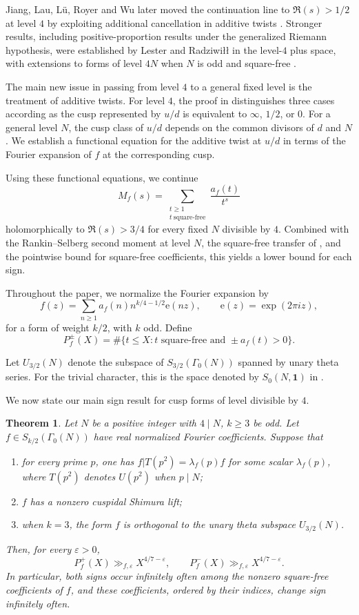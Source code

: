 \documentclass[10pt,a4paper]{amsart}
\newtheorem{theorem}{Theorem}[section]
\newcommand{\e}{\mathrm{e}}
\begin{document}
Jiang, Lau, L\"u, Royer and Wu later moved the continuation line to
$\Re(s)>1/2$ at level $4$ by exploiting additional cancellation in
additive twists \cite{JLRW}. Stronger results, including
positive-proportion results under the generalized Riemann hypothesis,
were established by Lester and Radziwi\l\l{} in the level-$4$ plus space,
with extensions to forms of level $4N$ when $N$ is odd and square-free
\cite{LesterRadz}.

The main new issue in passing from level $4$ to a general fixed level
is the treatment of additive twists. For level \(4\), the proof in
\cite{HKKL} distinguishes three cases according as the cusp represented by
\(u/d\) is equivalent to \(\infty\), \(1/2\), or \(0\).
For a general level \(N\), the cusp class of \(u/d\) depends on the
common divisors of \(d\) and \(N\). We establish a functional equation
for the additive twist at \(u/d\) in terms of the Fourier expansion of
\(f\) at the corresponding cusp. 

Using these functional equations, we continue
\[
M_f(s)=\sum_{\substack{t\geq1\\t\ \mathrm{square\text{-}free}}}
\frac{a_f(t)}{t^s}
\]
holomorphically to $\Re(s)>3/4$ for every fixed \(N\) divisible by \(4\). Combined with the Rankin--Selberg second moment at level
$N$, the square-free transfer of \cite[Lemma~9]{LRW}, and the pointwise
bound for square-free coefficients, this yields a lower bound
for each sign.

Throughout the paper, we normalize the Fourier expansion by
\[
f(z)=\sum_{n\ge1}a_f(n)n^{k/4-1/2}\e(nz),\qquad \e(z)=\exp(2\pi iz),
\]
for a form of weight $k/2$, with $k$ odd. Define
\[
P_f^\pm(X)=\#\{t\le X:t\text{ square-free and }\pm a_f(t)>0\}.
\]

Let $U_{3/2}(N)$ denote the subspace of $S_{3/2}(\Gamma_0(N))$ spanned
by unary theta series. For the trivial character, this is the space denoted
by $S_0(N,\mathbf 1)$ in \cite{PurkaitDecomposition}.

We now state our main sign result for cusp forms of level divisible by $4$.


\begin{theorem}\label{thm:general}
Let $N$ be a positive integer with $4\mid N$, $k\ge 3$ be odd. Let
$f\in S_{k/2}(\Gamma_0(N))$
have real normalized Fourier coefficients. Suppose that
\begin{enumerate}[label=\textup{(\arabic*)}]
\item for every prime $p$, one has
$f|T(p^2)=\lambda_f(p)f$ for some scalar $\lambda_f(p)$, where
$T(p^2)$ denotes $U(p^2)$ when $p\mid N$;
\item $f$ has a nonzero cuspidal Shimura lift;
\item when $k=3$, the form $f$ is orthogonal to the unary theta subspace
$U_{3/2}(N)$.
\end{enumerate}
Then, for every $\varepsilon>0$,
\[
P_f^+(X)\gg_{f,\varepsilon}X^{4/7-\varepsilon},\qquad
P_f^-(X)\gg_{f,\varepsilon}X^{4/7-\varepsilon}.
\]
In particular, both signs occur infinitely often among the nonzero
square-free coefficients of $f$, and these coefficients, ordered by their
indices, change sign infinitely often.
\end{theorem}
\end{document}
